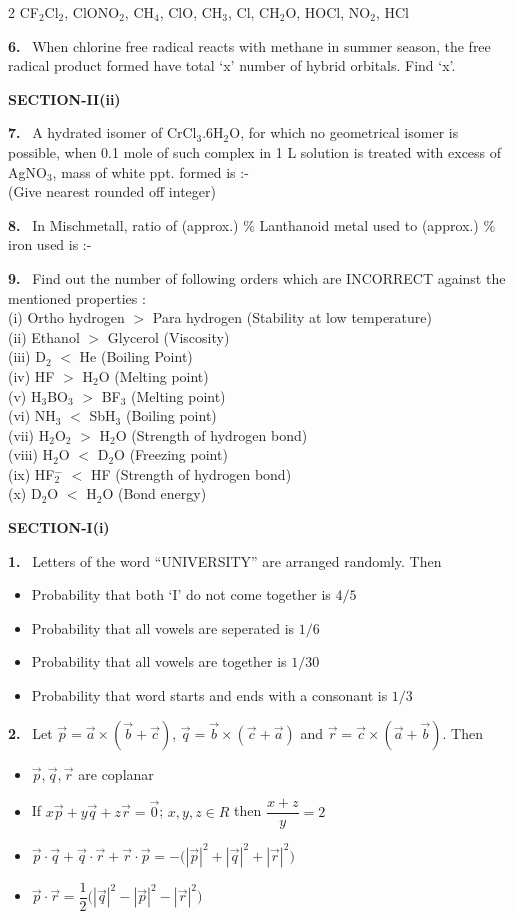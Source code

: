 \documentclass[10pt]{extarticle}
\newcommand{\partsec}[2]{\par\medskip\noindent{\large\bfseries PART-#1: #2}\par\smallskip}
\newcommand{\sect}[1]{\par\smallskip\noindent\textbf{#1}\par}
\newcommand{\qn}[1]{\par\smallskip\noindent\textbf{#1.}~}
\newenvironment{qoptions}{\begin{itemize}[leftmargin=1.8em,itemsep=1pt,topsep=2pt,label={}]}{\end{itemize}}
\newcommand{\opt}[2]{\item[(#1)] #2}
\begin{document}
\begin{multicols}{2}
CF$_2$Cl$_2$, ClONO$_2$, CH$_4$, ClO, CH$_3$, Cl, CH$_2$O, HOCl, NO$_2$, HCl
\qn{6} When chlorine free radical reacts with methane in summer season, the free radical product formed have total `x' number of hybrid orbitals. Find `x'.
\sect{SECTION-II(ii)}
\qn{7} A hydrated isomer of CrCl$_3$.6H$_2$O, for which no geometrical isomer is possible, when 0.1 mole of such complex in 1 L solution is treated with excess of AgNO$_3$, mass of white ppt. formed is :-\\
(Give nearest rounded off integer)
\qn{8} In Mischmetall, ratio of (approx.) \% Lanthanoid metal used to (approx.) \% iron used is :-
\qn{9} Find out the number of following orders which are INCORRECT against the mentioned properties :\\
(i) Ortho hydrogen $>$ Para hydrogen (Stability at low temperature)\\
(ii) Ethanol $>$ Glycerol (Viscosity)\\
(iii) D$_2$ $<$ He (Boiling Point)\\
(iv) HF $>$ H$_2$O (Melting point)\\
(v) H$_3$BO$_3$ $>$ BF$_3$ (Melting point)\\
(vi) NH$_3$ $<$ SbH$_3$ (Boiling point)\\
(vii) H$_2$O$_2$ $>$ H$_2$O (Strength of hydrogen bond)\\
(viii) H$_2$O $<$ D$_2$O (Freezing point)\\
(ix) HF$_2^-$ $<$ HF (Strength of hydrogen bond)\\
(x) D$_2$O $<$ H$_2$O (Bond energy)
\partsec{3}{MATHEMATICS}
\sect{SECTION-I(i)}
\qn{1} Letters of the word ``UNIVERSITY'' are arranged randomly. Then
\begin{qoptions}
\opt{A}{Probability that both `I' do not come together is $4/5$}
\opt{B}{Probability that all vowels are seperated is $1/6$}
\opt{C}{Probability that all vowels are together is $1/30$}
\opt{D}{Probability that word starts and ends with a consonant is $1/3$}
\end{qoptions}
\qn{2} Let $\vec p=\vec a\times(\vec b+\vec c)$, $\vec q=\vec b\times(\vec c+\vec a)$ and $\vec r=\vec c\times(\vec a+\vec b)$. Then
\begin{qoptions}
\opt{A}{$\vec p,\vec q,\vec r$ are coplanar}
\opt{B}{If $x\vec p+y\vec q+z\vec r=\vec 0$; $x,y,z\in R$ then $\dfrac{x+z}y=2$}
\opt{C}{$\vec p\cdot\vec q+\vec q\cdot\vec r+\vec r\cdot\vec p=-\bigl(|\vec p|^2+|\vec q|^2+|\vec r|^2\bigr)$}
\opt{D}{$\vec p\cdot\vec r=\dfrac12\bigl(|\vec q|^2-|\vec p|^2-|\vec r|^2\bigr)$}
\end{qoptions}

\end{multicols}
\end{document}
